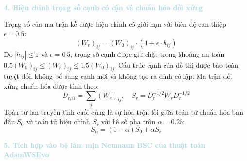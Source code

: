 \noindent\textcolor{lightblue}{\textbf{4. Hiệu chỉnh trọng số cạnh có cận và chuẩn hóa đối xứng}}

Trọng số của ma trận kề được hiệu chỉnh có giới hạn với biên độ can thiệp $\epsilon = 0.5$:
\begin{equation}
(W_r)_{ij} = (W_0)_{ij} \cdot (1 + \epsilon \cdot h_{ij})
\end{equation}
Do $|h_{ij}| \le 1$ và $\epsilon = 0.5$, trọng số cạnh được giữ chặt trong khoảng an toàn $0.5 (W_0)_{ij} \le (W_r)_{ij} \le 1.5 (W_0)_{ij}$. Cấu trúc cạnh của đồ thị được bảo toàn tuyệt đối, không bổ sung cạnh mới và không tạo ra đỉnh cô lập.
Ma trận đối xứng chuẩn hóa được tính theo:
\begin{equation}
D_{r, ii} = \sum_{j} (W_r)_{ij}, \quad S_r = D_r^{-1/2} W_r D_r^{-1/2}
\end{equation}
Toán tử lan truyền tĩnh cuối cùng là sự hòa trộn lồi giữa toán tử chuẩn hóa ban đầu $S_0$ và toán tử hiệu chỉnh $S_r$ với hệ số pha trộn $\alpha = 0.25$:
\begin{equation}
S_\alpha = (1 - \alpha) S_0 + \alpha S_r
\end{equation}

\noindent\textcolor{lightblue}{\textbf{5. Tích hợp vào bộ làm mịn Neumann BSC của thuật toán AdamWSEvo}}

